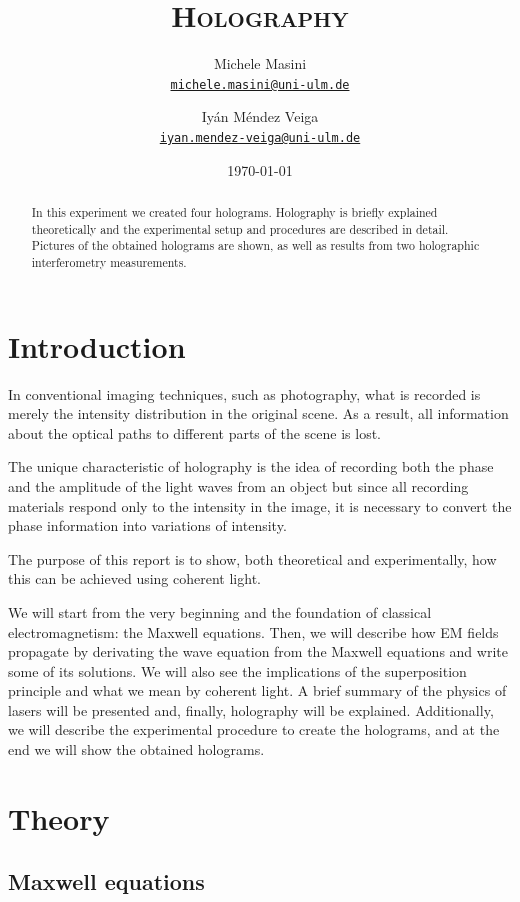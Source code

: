 \documentclass[11pt,a4paper]{article}
\title{\bfseries\textsc{Holography}}
\author{
Michele Masini\\ \small\texttt{\href{mailto:michele.masini@uni-ulm.de}{michele.masini@uni-ulm.de}}\and
Iyán Méndez Veiga\\ \small\texttt{\href{mailto:iyan.mendez-veiga@uni-ulm.de}{iyan.mendez-veiga@uni-ulm.de}}
}
\date{\today}
\begin{document}
\maketitle

\begin{abstract}
In this experiment we created four holograms. Holography is briefly explained theoretically and the experimental setup and procedures are described in detail. Pictures of the obtained holograms are shown, as well as results from two holographic interferometry measurements.
\end{abstract}

\vspace{1.5cm}

\section{Introduction}

In conventional imaging techniques, such as photography, what is recorded is merely the intensity distribution in the original scene. As a result, all information about the optical paths to different parts of the scene is lost.

The unique characteristic of holography is the idea of recording both the phase and the amplitude of the light waves from an object but since all recording materials respond only to the intensity in the image, it is necessary to convert
the phase information into variations of intensity.

The purpose of this report is to show, both theoretical and experimentally, how this can be achieved using coherent light.

We will start from the very beginning and the foundation of classical electromagnetism: the Maxwell equations. Then, we will describe how EM fields propagate by derivating the wave equation from the Maxwell equations and write some of its solutions. We will also see the implications of the superposition principle and what we mean by coherent light. A brief summary of the physics of lasers will be presented and, finally, holography will be explained. Additionally, we will describe the experimental procedure to create the holograms, and at the end we will show the obtained holograms.


\section{Theory}

\subsection{Maxwell equations}
\end{document}
